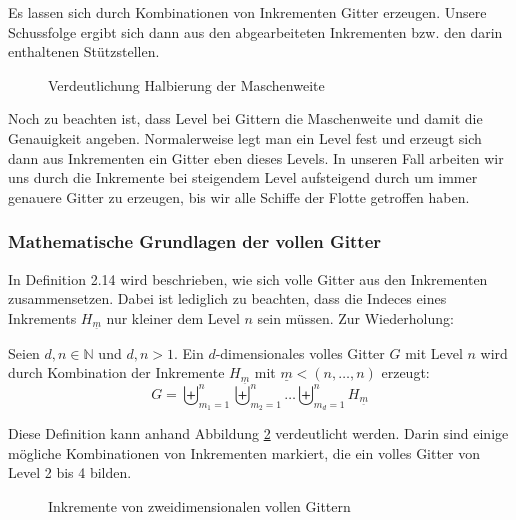 \documentclass[a4paper,12pt]{llncs}
\numberwithin{equation}{section}
\begin{document}
Es lassen sich durch Kombinationen von Inkrementen Gitter erzeugen. Unsere Schussfolge ergibt sich dann aus den abgearbeiteten Inkrementen bzw. den darin enthaltenen Stützstellen. 

\begin{figure}
	\centering
	\resizebox{90mm}{!}{}
	\caption{Verdeutlichung Halbierung der Maschenweite}
	\label{fig:gitter01}
\end{figure}


Noch zu beachten ist, dass Level bei Gittern die Maschenweite und damit die Genauigkeit angeben. Normalerweise legt man ein Level fest und erzeugt sich dann aus Inkrementen ein Gitter eben dieses Levels. In unseren Fall arbeiten wir uns durch die Inkremente bei steigendem Level aufsteigend durch um immer genauere Gitter zu erzeugen, bis wir alle Schiffe der Flotte getroffen haben.

\subsubsection{Mathematische Grundlagen der vollen Gitter}

In \cite{M13} Definition 2.14 wird beschrieben, wie sich volle Gitter aus den Inkrementen zusammensetzen. Dabei ist lediglich zu beachten, dass die Indeces eines Inkrements $H_{\underline{m}}$ nur kleiner dem Level $n$ sein müssen.  Zur Wiederholung:

\begin{definition}
	Seien $d,n\in\mathbb{N}$ und $d,n>1$. Ein $d$-dimensionales volles Gitter $G$ mit Level $n$ wird durch Kombination der Inkremente $H_{\underline{m}}$ mit $\underline{m}<(n,\dots,n)$ erzeugt:
	\begin{equation}
		G=\biguplus_{m_1=1}^n\biguplus_{m_2=1}^n\dots \biguplus_{m_d=1}^n H_{\underline{m}}
	\end{equation}
\end{definition}

Diese Definition kann anhand Abbildung \ref{fig:gitter02} verdeutlicht werden. Darin sind einige mögliche Kombinationen von Inkrementen markiert, die ein volles Gitter von Level 2 bis 4 bilden.

\begin{figure}
	\caption{Inkremente von zweidimensionalen vollen Gittern}
	\label{fig:gitter02}
\end{figure}
\end{document}
